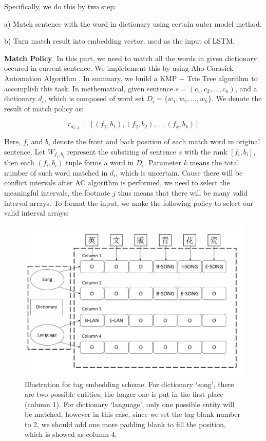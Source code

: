 \documentclass[letterpaper]{article} %
\begin{document}
Specifically, we do this by two step: 

a)  Match sentence with the word in dictionary using certain outer model method.

b)  Turn match result into embedding vector, used as the input of LSTM.



\textbf{Match Policy}. In this part, we need to match all the words in given dictionary occured in current sentence. We impletement this by using Aho-Corasick Automation Algorithm \cite{acalg}. In summary, we build a KMP \cite{kmp} + Trie Tree \cite{trietree} algorithm to accomplish this task. In methematical, given sentence $s = (c_1, c_2, ..., c_n) $, and a dictionary $d_i$, which is composed of word set $D_i=\{w_1, w_2, ..., w_V\}$. We denote the result of match policy as:

\begin{equation}
r_{d_i, j} = [ (f_1, b_1), (f_2 , b_2), ..., (f_k, b_k) ] \label{match_result}
\end{equation}



Here, $f_i$ and $b_i$ denote the front and back position of each match word in original sentence. Let $W_{f_i,b_i}$ represent the substring of sentence $s$ with the rank $[f_i, b_i]$, then each $(f_i, b_i)$ tuple forms a word in $D_i$. Parameter $k$ means the total number of such word matched in $d_i$, which is uncertain. Cause there will be conflict intervals after AC algorithm is performed, we need to select the meaningful intervals, the footnote $j$ thus means that there will be many valid interval arrays. To format the input, we make the following policy to select our valid interval arrays:


\begin{figure}[t]
\centering
\includegraphics[width=0.9\columnwidth]{tag_scheme} %
\caption{Illustration for tag embedding scheme. For dictionary `song', there are two possible entities, the longer one is put in the first place (column 1). For dictionary `language', only one possible entity will be matched, however in this case, since we set the tag blank number to 2, we should add one more padding blank to fill the position, which is showed as column 4. }
\label{tag_scheme}
\end{figure}
\end{document}
